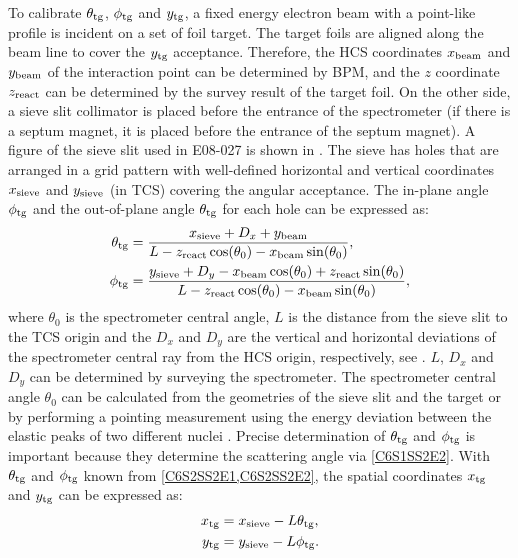 To calibrate $\theta_{\mathrm{tg}}$, $\phi_{\mathrm{tg}}$ and $y_{\mathrm{tg}}$, a fixed energy electron beam with a point-like profile is incident on a set of foil target. The target foils are aligned along the beam line to cover the $y_{\mathrm{tg}}$ acceptance. Therefore, the HCS coordinates $x_{\mathrm{beam}}$ and $y_{\mathrm{beam}}$ of the interaction point can be determined by BPM, and the $z$ coordinate $z_{\mathrm{react}}$ can be determined by the survey result of the target foil. On the other side, a sieve slit collimator is placed before the entrance of the spectrometer (if there is a septum magnet, it is placed before the entrance of the septum magnet). A figure of the sieve slit used in E08-027 is shown in . The sieve has holes that are arranged in a grid pattern with well-defined horizontal and vertical coordinates $x_{\mathrm{sieve}}$ and $y_{\mathrm{sieve}}$ (in TCS) covering the angular acceptance. The in-plane angle $\phi_{\mathrm{tg}}$ and the out-of-plane angle $\theta_{\mathrm{tg}}$ for each hole can be expressed as:
\begin{align} \label{C6S2SS2E1}
\theta_{\mathrm{tg}} & = \frac{x_{\mathrm{sieve}}+D_x+y_{\mathrm{beam}}}{L-z_{\mathrm{react}}\cos(\theta_0)-x_{\mathrm{beam}}\sin(\theta_0)}, \\ \label{C6S2SS2E2}
\phi_{\mathrm{tg}} & = \frac{y_{\mathrm{sieve}}+D_y-x_{\mathrm{beam}}\cos(\theta_0)+z_{\mathrm{react}}\sin(\theta_0)}{L-z_{\mathrm{react}}\cos(\theta_0)-x_{\mathrm{beam}}\sin(\theta_0)},
\end{align}
where $\theta_0$ is the spectrometer central angle, $L$ is the distance from the sieve slit to the TCS origin and the $D_x$ and $D_y$ are the vertical and horizontal deviations of the spectrometer central ray from the HCS origin, respectively, see . $L$, $D_x$ and $D_y$ can be determined by surveying the spectrometer. The spectrometer central angle $\theta_0$ can be calculated from the geometries of the sieve slit and the target or by performing a pointing measurement using the energy deviation between the elastic peaks of two different nuclei \cite{Liyanage2011}. Precise determination of $\theta_{\mathrm{tg}}$ and $\phi_{\mathrm{tg}}$ is important because they determine the scattering angle via \cref{C6S1SS2E2}. With $\theta_{\mathrm{tg}}$ and $\phi_{\mathrm{tg}}$ known from \cref{C6S2SS2E1,C6S2SS2E2}, the spatial coordinates $x_{\mathrm{tg}}$ and $y_{\mathrm{tg}}$ can be expressed as:
\begin{align} \label{C6S2SS2E3}
x_{\mathrm{tg}} & = x_{\mathrm{sieve}}-L\theta_{\mathrm{tg}}, \\ \label{C6S2SS2E4}
y_{\mathrm{tg}} & = y_{\mathrm{sieve}}-L\phi_{\mathrm{tg}}.
\end{align}

